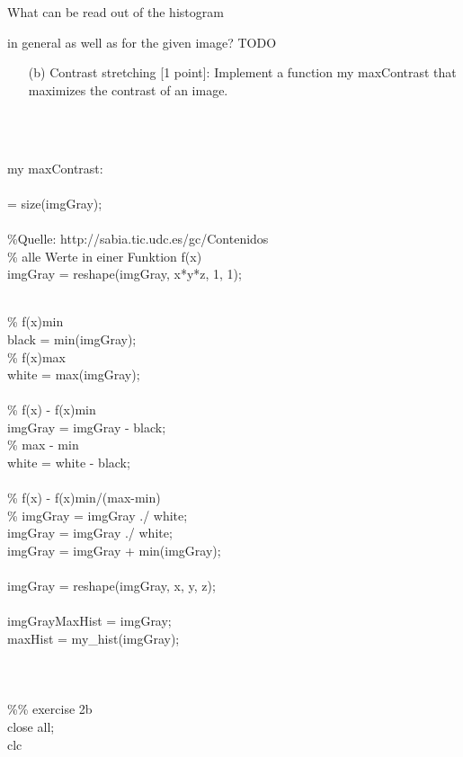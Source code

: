    What can be read out of the histogram { in general as well as for the given image? TODO 
\pagebreak
    \begin{enumerate}        
        \item[(b)] {Contrast stretching [1 point]: Implement a function my maxContrast that maximizes the contrast of an image.}
    \end{enumerate}
    \\ \ \\
    \raggedright{
    my maxContrast: \\ \ \\
    [x,y,z] = size(imgGray);
    \\
    \\ \%Quelle: http://sabia.tic.udc.es/gc/Contenidos%
    \\ \% alle Werte in einer Funktion f(x)
    \\ imgGray = reshape(imgGray, x*y*z, 1, 1);

    \\ \% f(x)min
    \\ black = min(imgGray);
    \\ \% f(x)max
    \\ white = max(imgGray);
    \\
    \\ \% f(x) - f(x)min
    \\ imgGray = imgGray - black;
    \\ \% max - min
    \\ white = white - black;
    \\
    \\ \% f(x) - f(x)min/(max-min)
    \\ \% imgGray = imgGray ./ white;
    \\ imgGray = imgGray ./ white;
    \\ imgGray = imgGray + min(imgGray);
    \\
    \\ imgGray = reshape(imgGray, x, y, z);
    \\
    \\ imgGrayMaxHist = imgGray;
    \\ maxHist = my_hist(imgGray);
    \\ \ \\
    \\ \ \\
    \%\% exercise 2b
    \\ close all;
    \\ clc

}}
